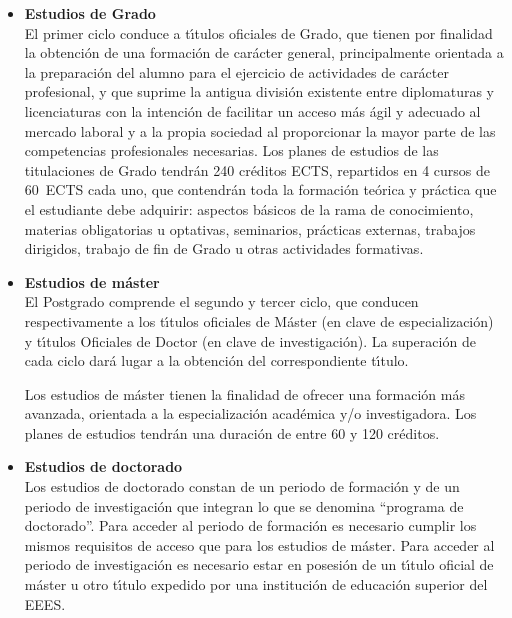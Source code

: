 \begin{itemize}
\item {\bf Estudios de Grado}\\
El primer ciclo conduce a t\'{\i}tulos oficiales de Grado, que tienen por
 finalidad la obtenci\'{o}n de una formaci\'{o}n de car\'{a}cter general,
 principalmente orientada a la preparaci\'{o}n del alumno para el ejercicio de actividades de car\'{a}cter profesional, y
que suprime la antigua divisi\'{o}n  existente entre diplomaturas 
y licenciaturas con la intenci\'{o}n de facilitar un acceso m\'{a}s \'{a}gil
 y adecuado al mercado laboral y a la propia sociedad al proporcionar
 la mayor parte de las competencias profesionales necesarias. 
Los planes de estudios de las titulaciones de Grado tendr\'{a}n
 240 cr\'{e}ditos ECTS, repartidos en 4 cursos de 60~ECTS cada uno,
 que contendr\'{a}n toda la formaci\'{o}n
 te\'{o}rica y pr\'{a}ctica que el estudiante debe adquirir:
 aspectos b\'{a}sicos de la rama de conocimiento, materias obligatorias
u optativas, seminarios, pr\'{a}cticas externas, trabajos dirigidos,
trabajo de fin de Grado u otras actividades formativas.

\item{\bf Estudios de m\'{a}ster}\\
El Postgrado
comprende el segundo y tercer ciclo,  que conducen respectivamente
 a los t\'{\i}tulos 
oficiales de  M\'{a}ster (en clave de especializaci\'{o}n) y
t\'{\i}tulos Oficiales de  Doctor (en clave de investigaci\'{o}n).
La superaci\'{o}n de cada ciclo dar\'{a} lugar a la obtenci\'{o}n del
correspondiente t\'{\i}tulo.

Los estudios de m\'{a}ster tienen la finalidad de ofrecer una formaci\'{o}n
 m\'{a}s avanzada, orientada a la especializaci\'{o}n acad\'{e}mica y/o 
investigadora.
Los planes de estudios tendr\'{a}n una duraci\'{o}n de entre 60 y 120 
cr\'{e}ditos.


\item{\bf Estudios de doctorado}\\
Los estudios de doctorado constan de un periodo de formaci\'{o}n y de un periodo de investigaci\'{o}n que integran lo que se denomina
 ``programa de doctorado''.
Para acceder al periodo de formaci\'{o}n es 
necesario cumplir los mismos requisitos de acceso que para los estudios de 
m\'{a}ster.
Para acceder al periodo de investigaci\'{o}n es necesario estar en posesi\'{o}n de un t\'{\i}tulo oficial de m\'{a}ster u otro t\'{\i}tulo expedido por una instituci\'{o}n de educaci\'{o}n superior del EEES.

\end{itemize}

